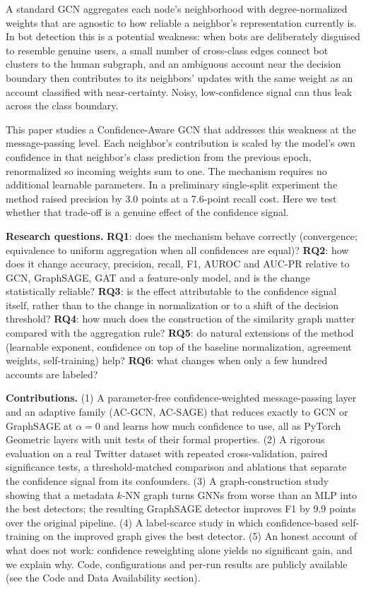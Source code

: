 \documentclass{csimq}
\begin{document}
A standard GCN \cite{kipf2017gcn} aggregates each node's neighborhood with degree-normalized weights that are agnostic to how reliable a neighbor's representation currently is. In bot detection this is a potential weakness: when bots are deliberately disguised to resemble genuine users, a small number of cross-class edges connect bot clusters to the human subgraph, and an ambiguous account near the decision boundary then contributes to its neighbors' updates with the same weight as an account classified with near-certainty. Noisy, low-confidence signal can thus leak across the class boundary.

This paper studies a Confidence-Aware GCN that addresses this weakness at the message-passing level. Each neighbor's contribution is scaled by the model's own confidence in that neighbor's class prediction from the previous epoch, renormalized so incoming weights sum to one. The mechanism requires no additional learnable parameters. In a preliminary single-split experiment the method raised precision by 3.0 points at a 7.6-point recall cost. Here we test whether that trade-off is a genuine effect of the confidence signal.

\textbf{Research questions.} \textbf{RQ1}: does the mechanism behave correctly (convergence; equivalence to uniform aggregation when all confidences are equal)? \textbf{RQ2}: how does it change accuracy, precision, recall, F1, AUROC and AUC-PR relative to GCN, GraphSAGE, GAT and a feature-only model, and is the change statistically reliable? \textbf{RQ3}: is the effect attributable to the confidence signal itself, rather than to the change in normalization or to a shift of the decision threshold? \textbf{RQ4}: how much does the construction of the similarity graph matter compared with the aggregation rule? \textbf{RQ5}: do natural extensions of the method (learnable exponent, confidence on top of the baseline normalization, agreement weights, self-training) help? \textbf{RQ6}: what changes when only a few hundred accounts are labeled?

\textbf{Contributions.} (1) A parameter-free confidence-weighted message-passing layer and an adaptive family (AC-GCN, AC-SAGE) that reduces exactly to GCN or GraphSAGE at $\alpha=0$ and learns how much confidence to use, all as PyTorch Geometric layers with unit tests of their formal properties. (2) A rigorous evaluation on a real Twitter dataset with repeated cross-validation, paired significance tests, a threshold-matched comparison and ablations that separate the confidence signal from its confounders. (3) A graph-construction study showing that a metadata $k$-NN graph turns GNNs from worse than an MLP into the best detectors; the resulting GraphSAGE detector improves F1 by 9.9 points over the original pipeline. (4) A label-scarce study in which confidence-based self-training on the improved graph gives the best detector. (5) An honest account of what does not work: confidence reweighting alone yields no significant gain, and we explain why. Code, configurations and per-run results are publicly available (see the Code and Data Availability section).
\end{document}

